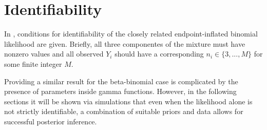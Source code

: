 \section{Identifiability}
\label{sec:ident}

In \cite{Dupuy2017}, conditions for identifiability of the closely related endpoint-inflated binomial likelihood are given. Briefly, all three componentes of the mixture must have nonzero values and all observed $Y_i$ should have a corresponding $n_i \in \{3,...,M\}$ for some finite integer $M$.

Providing a similar result for the beta-binomial case is complicated by the presence of parameters inside gamma functions. However, in the following sections it will be shown via simulations that even when the likelihood alone is not strictly identifiable, a combination of suitable priors and data allows for successful posterior inference.